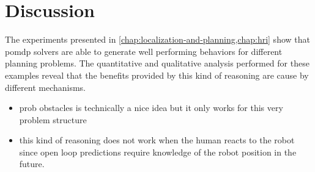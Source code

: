 \iffalse
\chapter{Discussion}\label{chap:discussion}


The experiments presented in \cref{chap:localization-and-planning,chap:hri}
show that \ac{pomdp} solvers are able to generate well performing behaviors for
different planning problems. The quantitative and qualitative analysis
performed for these examples reveal that the benefits provided by this kind of
reasoning are cause by different mechanisms.

\begin{itemize}
  \item prob obstacles is technically a nice idea but it only works for this very problem structure
  \item this kind of reasoning does not work when the human reacts to the robot since open loop predictions
  require knowledge of the robot position in the future.
\end{itemize}


